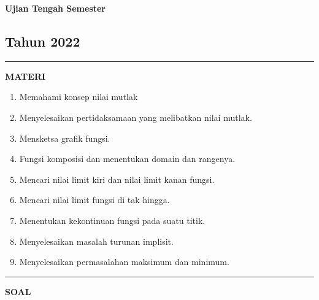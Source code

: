 \newpage
\begin{flushright}
    \textbf{\Large{Ujian Tengah Semester}}
    \subsection*{Tahun 2022}
\end{flushright}
\vspace{0.5cm}
\hrule height 2pt
\vspace{0.5cm}
\begin{center}
    \textbf{\large{MATERI}}
    \begin{enumerate}[leftmargin=*, label={\arabic*}.]
        \item Memahami konsep nilai mutlak
        \item Menyelesaikan pertidaksamaan yang melibatkan nilai mutlak.
        \item Mensketsa grafik fungsi.
        \item Fungsi komposisi dan menentukan domain dan rangenya.
        \item Mencari nilai limit kiri dan nilai limit kanan fungsi.
        \item Mencari nilai limit fungsi di tak hingga.
        \item Menentukan kekontinuan fungsi pada suatu titik.
        \item Menyelesaikan masalah turunan implisit.
        \item Menyelesaikan permasalahan maksimum dan minimum.
    \end{enumerate}
\end{center}
\vspace{0.2cm}
\hrule height 1pt
\vspace{0.5cm}
\begin{center}
    \textbf{\large{SOAL}}
\end{center}
